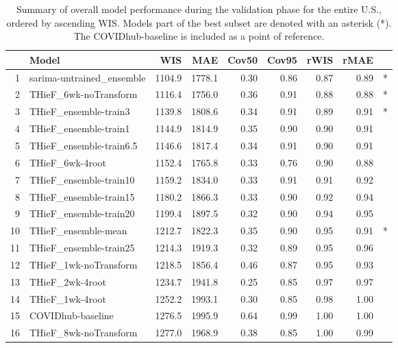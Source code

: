 \documentclass[12pt]{article}
\begin{document}
\begin{table}%
\begin{center}
\caption{Summary of overall model performance during the validation phase for the entire U.S., ordered by ascending WIS. Models part of the best subset are denoted with an asterisk (*). The COVIDhub-baseline is included as a point of reference.}
\label{tab:table_validation_us}
\begin{tabular}{rlrrrrrrl}
  \hline
 & Model & WIS & MAE & Cov50 & Cov95 & rWIS & rMAE &   \\ 
  \hline
1 & sarima-untrained\_ensemble & 1104.9 & 1778.1 & 0.30 & 0.86 & 0.87 & 0.89 & * \\ 
  2 & THieF\_6wk-noTransform & 1116.4 & 1756.0 & 0.36 & 0.91 & 0.88 & 0.88 & * \\ 
  3 & THieF\_ensemble-train3 & 1139.8 & 1808.6 & 0.34 & 0.91 & 0.89 & 0.91 & * \\ 
  4 & THieF\_ensemble-train1 & 1144.9 & 1814.9 & 0.35 & 0.90 & 0.90 & 0.91 &  \\ 
  5 & THieF\_ensemble-train6.5 & 1146.6 & 1817.4 & 0.34 & 0.91 & 0.90 & 0.91 &  \\ 
  6 & THieF\_6wk-4root & 1152.4 & 1765.8 & 0.33 & 0.76 & 0.90 & 0.88 &  \\ 
  7 & THieF\_ensemble-train10 & 1159.2 & 1834.0 & 0.33 & 0.91 & 0.91 & 0.92 &  \\ 
  8 & THieF\_ensemble-train15 & 1180.2 & 1866.3 & 0.33 & 0.90 & 0.92 & 0.94 &  \\ 
  9 & THieF\_ensemble-train20 & 1199.4 & 1897.5 & 0.32 & 0.90 & 0.94 & 0.95 &  \\ 
  10 & THieF\_ensemble-mean & 1212.7 & 1822.3 & 0.35 & 0.90 & 0.95 & 0.91 & * \\ 
  11 & THieF\_ensemble-train25 & 1214.3 & 1919.3 & 0.32 & 0.89 & 0.95 & 0.96 &  \\ 
  12 & THieF\_1wk-noTransform & 1218.5 & 1856.4 & 0.46 & 0.87 & 0.95 & 0.93 &  \\ 
  13 & THieF\_2wk-4root & 1234.7 & 1941.8 & 0.25 & 0.85 & 0.97 & 0.97 &  \\ 
  14 & THieF\_1wk-4root & 1252.2 & 1993.1 & 0.30 & 0.85 & 0.98 & 1.00 &  \\ 
  15 & COVIDhub-baseline & 1276.5 & 1995.9 & 0.64 & 0.99 & 1.00 & 1.00 &  \\ 
  16 & THieF\_8wk-noTransform & 1277.0 & 1968.9 & 0.38 & 0.85 & 1.00 & 0.99 &  \\ 

\end{tabular}
\end{center}
\end{table}
\end{document}
